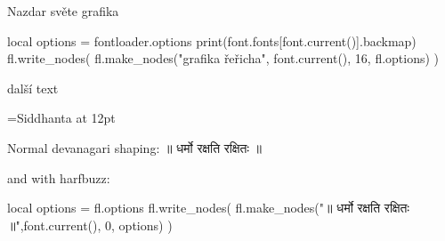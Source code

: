 \documentclass{article}
\begin{document}
\ahoj Nazdar světe grafika
\begin{luacode*}
  local options = fontloader.options
  print(font.fonts[font.current()].backmap)
  fl.write_nodes(
    fl.make_nodes("grafika řeřicha", font.current(), 16, fl.options)
  )
\end{luacode*}

další text

\font\siddhanta={Siddhanta} at 12pt
\bigskip

\siddhanta 

Normal devanagari shaping: ॥ धर्मो रक्षति रक्षितः ॥

and with harfbuzz: 
\begin{luacode*}
  local options = fl.options
fl.write_nodes(
  fl.make_nodes("॥ धर्मो रक्षति रक्षितः ॥",font.current(), 0, options)
 )
\end{luacode*}
\end{document}

